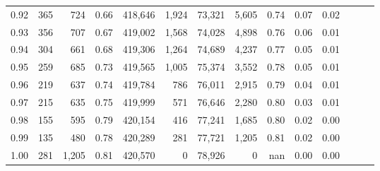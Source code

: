 \begin{tabular}{rrrrrrrrrrrrrr}
0.92 &    365 &    724 &  0.66 &  418,646 &    1,924 &  73,321 &   5,605 &  0.74 &  0.07 &      0.02 \\
0.93 &    356 &    707 &  0.67 &  419,002 &    1,568 &  74,028 &   4,898 &  0.76 &  0.06 &      0.01 \\
0.94 &    304 &    661 &  0.68 &  419,306 &    1,264 &  74,689 &   4,237 &  0.77 &  0.05 &      0.01 \\
0.95 &    259 &    685 &  0.73 &  419,565 &    1,005 &  75,374 &   3,552 &  0.78 &  0.05 &      0.01 \\
0.96 &    219 &    637 &  0.74 &  419,784 &      786 &  76,011 &   2,915 &  0.79 &  0.04 &      0.01 \\
0.97 &    215 &    635 &  0.75 &  419,999 &      571 &  76,646 &   2,280 &  0.80 &  0.03 &      0.01 \\
0.98 &    155 &    595 &  0.79 &  420,154 &      416 &  77,241 &   1,685 &  0.80 &  0.02 &      0.00 \\
0.99 &    135 &    480 &  0.78 &  420,289 &      281 &  77,721 &   1,205 &  0.81 &  0.02 &      0.00 \\
1.00 &    281 &  1,205 &  0.81 &  420,570 &        0 &  78,926 &       0 &   nan &  0.00 &      0.00 \\
\bottomrule
\end{tabular}
